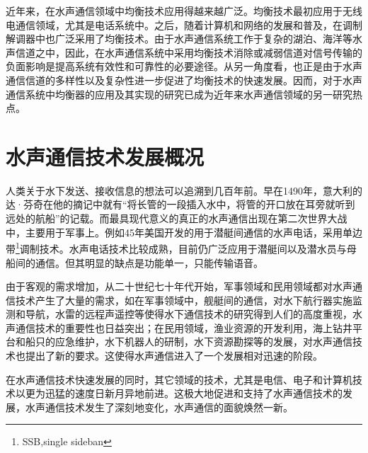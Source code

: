  近年来，在水声通信领域中均衡技术应用得越来越广泛。均衡技术最初应用于无线电通信领域，尤其是电话系统中。之后，随着计算机和网络的发展和普及，在调制解调器中也广泛采用了均衡技术。由于水声通信系统工作于复杂的湖泊、海洋等水声信道之中，因此，在水声通信系统中采用均衡技术消除或减弱信道对信号传输的负面影响是提高系统有效性和可靠性的必要途径。从另一角度看，也正是由于水声通信信道的多样性以及复杂性进一步促进了均衡技术的快速发展。因而，对于水声通信系统中均衡器的应用及其实现的研究已成为近年来水声通信领域的另一研究热点。 
\section{水声通信技术发展概况}
人类关于水下发送、接收信息的想法可以追溯到几百年前。早在1490年，意大利的达·芬奇在他的摘记中就有“将长管的一段插入水中，将管的开口放在耳旁就听到远处的航船”的记载。而最具现代意义的真正的水声通信出现在第二次世界大战中，主要用于军事上。例如45年美国开发的用于潜艇间通信的水声电话，采用单边带\footnote{SSB,single sideban
}调制技术。水声电话技术比较成熟，目前仍广泛应用于潜艇间以及潜水员与母船间的通信。但其明显的缺点是功能单一，只能传输语音。

由于客观的需求增加，从二十世纪七十年代开始，军事领域和民用领域都对水声通信技术产生了大量的需求，如在军事领域中，舰艇间的通信，对水下航行器实施监测和导航，水雷的远程声遥控等使得水下通信技术的研究得到人们的高度重视，水声通信技术的重要性也日益突出；在民用领域，渔业资源的开发利用，海上钻井平台和船只的应急维护，水下机器人的研制，水下资源勘探等的发展，对水声通信技术也提出了新的要求。这使得水声通信进入了一个发展相对迅速的阶段。

在水声通信技术快速发展的同时，其它领域的技术，尤其是电信、电子和计算机技术以更为迅猛的速度日新月异地前进。这极大地促进和支持了水声通信技术的发展，水声通信技术发生了深刻地变化，水声通信的面貌焕然一新。

